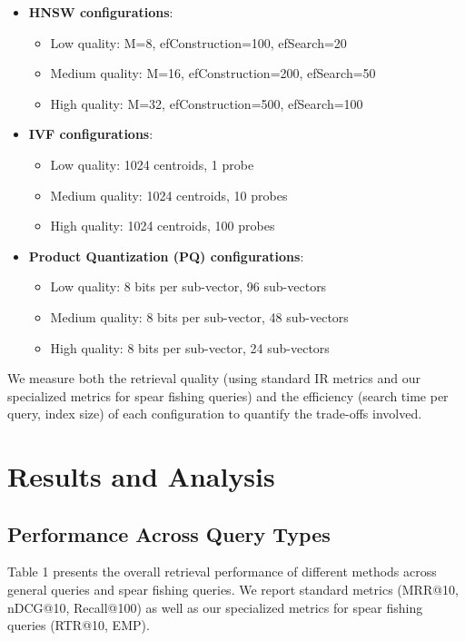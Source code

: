 \documentclass[sigconf,review]{acmart}
\begin{document}
\begin{itemize}
\item \textbf{HNSW configurations}:
\begin{itemize}
    \item Low quality: M=8, efConstruction=100, efSearch=20
    \item Medium quality: M=16, efConstruction=200, efSearch=50
    \item High quality: M=32, efConstruction=500, efSearch=100
\end{itemize}

\item \textbf{IVF configurations}:
\begin{itemize}
    \item Low quality: 1024 centroids, 1 probe
    \item Medium quality: 1024 centroids, 10 probes
    \item High quality: 1024 centroids, 100 probes
\end{itemize}

\item \textbf{Product Quantization (PQ) configurations}:
\begin{itemize}
    \item Low quality: 8 bits per sub-vector, 96 sub-vectors
    \item Medium quality: 8 bits per sub-vector, 48 sub-vectors
    \item High quality: 8 bits per sub-vector, 24 sub-vectors
\end{itemize}
\end{itemize}

We measure both the retrieval quality (using standard IR metrics and our specialized metrics for spear fishing queries) and the efficiency (search time per query, index size) of each configuration to quantify the trade-offs involved.

\section{Results and Analysis}
\subsection{Performance Across Query Types}
Table 1 presents the overall retrieval performance of different methods across general queries and spear fishing queries. We report standard metrics (MRR@10, nDCG@10, Recall@100) as well as our specialized metrics for spear fishing queries (RTR@10, EMP).
\end{document}
